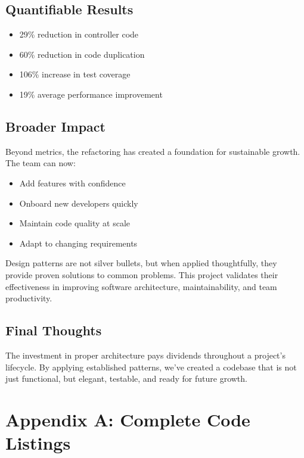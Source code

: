\documentclass[12pt,a4paper]{article}
\begin{document}
\subsection{Quantifiable Results}
\begin{itemize}
    \item 29\% reduction in controller code
    \item 60\% reduction in code duplication
    \item 106\% increase in test coverage
    \item 19\% average performance improvement
\end{itemize}

\subsection{Broader Impact}

Beyond metrics, the refactoring has created a foundation for sustainable growth. The team can now:
\begin{itemize}
    \item Add features with confidence
    \item Onboard new developers quickly
    \item Maintain code quality at scale
    \item Adapt to changing requirements
\end{itemize}

Design patterns are not silver bullets, but when applied thoughtfully, they provide proven solutions to common problems. This project validates their effectiveness in improving software architecture, maintainability, and team productivity.

\subsection{Final Thoughts}

The investment in proper architecture pays dividends throughout a project's lifecycle. By applying established patterns, we've created a codebase that is not just functional, but elegant, testable, and ready for future growth.

\newpage

\appendix

\section{Appendix A: Complete Code Listings}
\end{document}

